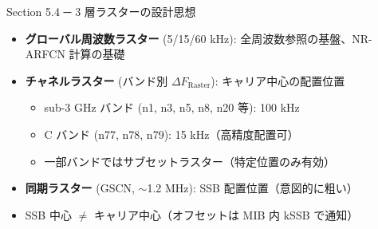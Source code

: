 \begin{frame}{Section 5.4 ─ 3 層ラスターの設計思想}
\begin{itemize}
  \item \textbf{グローバル周波数ラスター} (5/15/60 kHz): 全周波数参照の基盤、NR-ARFCN 計算の基礎
  \item \textbf{チャネルラスター} (バンド別 $\Delta F_{\mathrm{Raster}}$): キャリア中心の配置位置
    \begin{itemize}
      \item sub-3 GHz バンド (n1, n3, n5, n8, n20 等): 100 kHz
      \item C バンド (n77, n78, n79): 15 kHz（高精度配置可）
      \item 一部バンドではサブセットラスター（特定位置のみ有効）
    \end{itemize}
  \item \textbf{同期ラスター} (GSCN, $\sim$1.2 MHz): SSB 配置位置（意図的に粗い）
  \item SSB 中心 $\neq$ キャリア中心（オフセットは MIB 内 kSSB で通知）
\end{itemize}
\end{frame}
